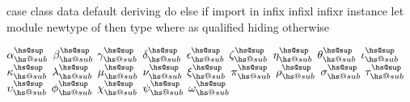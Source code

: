 \newif\ifhs@inline

\def\lambdaTeX{$\lambda$\kern-1.5pt\TeX}

\newdimen\hs@space
\newdimen\hs@guardpos
\newdimen\hs@previndent
\newdimen\hs@indent

\newbox\voidb@x %
\newbox\hs@i
\newbox\hs@ii
\newbox\hs@iii

\def\typeset#1#2{\expandafter\def\csname<#1>\endcsname{#2}}

\typeset{case}{{\hs@keyface case}}
\typeset{class}{{\hs@keyface class}}
\typeset{data}{{\hs@keyface data}}
\typeset{default}{{\hs@keyface default}}
\typeset{deriving}{{\hs@keyface deriving}}
\typeset{do}{{\hs@keyface do}}
\typeset{else}{{\hs@keyface else}}
\typeset{if}{{\hs@keyface if}}
\typeset{import}{{\hs@keyface import}}
\typeset{in}{{\hs@keyface in}}
\typeset{infix}{{\hs@keyface infix}}
\typeset{infixl}{{\hs@keyface infixl}}
\typeset{infixr}{{\hs@keyface infixr}}
\typeset{instance}{{\hs@keyface instance}}
\typeset{let}{{\hs@keyface let}}
\typeset{module}{{\hs@keyface module}}
\typeset{newtype}{{\hs@keyface newtype}}
\typeset{of}{{\hs@keyface of}}
\typeset{then}{{\hs@keyface then}}
\typeset{type}{{\hs@keyface type}}
\typeset{where}{{\hs@keyface where}}
\typeset{as}{{\hs@keyface as}}
\typeset{qualified}{{\hs@keyface qualified}}
\typeset{hiding}{{\hs@keyface hiding}}
\typeset{otherwise}{{\hs@keyface otherwise}}

\typeset{alpha}{$\alpha^{\hs@sup}_{\hs@sub}$}
\typeset{beta}{$\beta^{\hs@sup}_{\hs@sub}$}
\typeset{gamma}{$\gamma^{\hs@sup}_{\hs@sub}$}
\typeset{delta}{$\delta^{\hs@sup}_{\hs@sub}$}
\typeset{epsilon}{$\epsilon^{\hs@sup}_{\hs@sub}$}
\typeset{zeta}{$\zeta^{\hs@sup}_{\hs@sub}$}
\typeset{eta}{$\eta^{\hs@sup}_{\hs@sub}$}
\typeset{theta}{$\theta^{\hs@sup}_{\hs@sub}$}
\typeset{iota}{$\iota^{\hs@sup}_{\hs@sub}$}
\typeset{kappa}{$\kappa^{\hs@sup}_{\hs@sub}$}
\typeset{lambda}{$\lambda^{\hs@sup}_{\hs@sub}$}
\typeset{mu}{$\mu^{\hs@sup}_{\hs@sub}$}
\typeset{nu}{$\nu^{\hs@sup}_{\hs@sub}$}
\typeset{xi}{$\xi^{\hs@sup}_{\hs@sub}$}
\typeset{pi}{$\pi^{\hs@sup}_{\hs@sub}$}
\typeset{rho}{$\rho^{\hs@sup}_{\hs@sub}$}
\typeset{sigma}{$\sigma^{\hs@sup}_{\hs@sub}$}
\typeset{tau}{$\tau^{\hs@sup}_{\hs@sub}$}
\typeset{upsilon}{$\upsilon^{\hs@sup}_{\hs@sub}$}
\typeset{phi}{$\phi^{\hs@sup}_{\hs@sub}$}
\typeset{chi}{$\chi^{\hs@sup}_{\hs@sub}$}
\typeset{psi}{$\psi^{\hs@sup}_{\hs@sub}$}
\typeset{omega}{$\omega^{\hs@sup}_{\hs@sub}$}

